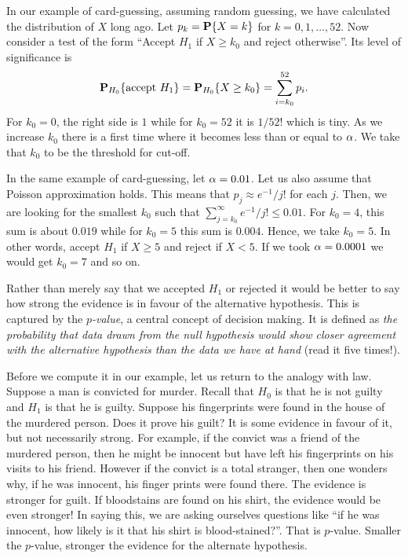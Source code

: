 \documentclass[preprint,  11pt]{amsart}
\begin{document}
In our example of card-guessing, assuming random guessing, we have calculated the distribution of $X$ long ago. Let $p_{k}=\P\{X=k\}$ for $k=0,1,\ldots ,52$.  Now consider a test of the form ``Accept $H_{1}$ if $X\ge k_{0}$ and reject otherwise''. Its level of significance is
$$
\P_{H_{0}}\{\mb{accept }H_{1}\} = \P_{H_{0}}\{X\ge k_{0}\} = \sum_{i=k_{0}}^{52}p_{i}.
$$
For $k_{0}=0$, the right side is $1$ while for $k_{0}=52$ it is $1/52!$ which is tiny. As we increase $k_{0}$ there is a first time where it becomes less than or equal to $\alp$. We take that $k_{0}$ to be the threshold for cut-off.

 In the same example of card-guessing, let $\alp=0.01$. Let us also assume that Poisson approximation holds. This means that $p_{j}\approx e^{-1}/j! $ for each $j$. Then, we are looking for the smallest $k_{0}$ such that $\sum_{j=k_{0}}^{\infty}e^{-1}/j! \le 0.01$. For $k_{0}=4$, this sum is about $0.019$ while for $k_{0}=5$ this sum is $0.004$. Hence, we take $k_{0}=5$. In other words, accept $H_{1}$ if $X\ge 5$ and reject if $X<5$. If we took $\alp=0.0001$ we would get $k_{0}=7$ and so on.

 Rather than merely say that we accepted $H_{1}$ or rejected it would be better to say how strong the evidence is in favour of the alternative hypothesis. This is captured by the {\em $p$-value}, a central concept of decision making. It is defined as {\em the probability that data drawn from the null hypothesis would show closer agreement with the alternative hypothesis than the data we have at hand} (read it five times!).

Before we compute it in our example, let us return to the analogy with law. Suppose  a man is convicted for murder. Recall that $H_{0}$ is that he is not guilty and $H_{1}$ is that he is guilty. Suppose his fingerprints were found in the house of the murdered person. Does it prove his guilt? It is some evidence in favour of it, but not necessarily strong. For example, if the convict was a friend of the murdered person, then he might be innocent but have left his fingerprints on his visits to his friend. However if the convict is a total stranger, then one wonders why, if he was innocent, his finger prints were found there. The evidence is stronger for guilt. If bloodstains are found on his shirt, the evidence would be even stronger! In saying this, we are  asking ourselves questions like ``if he was innocent, how likely is it that his shirt is blood-stained?''. That is $p$-value. Smaller the $p$-value, stronger the evidence for the alternate hypothesis.
\end{document}
